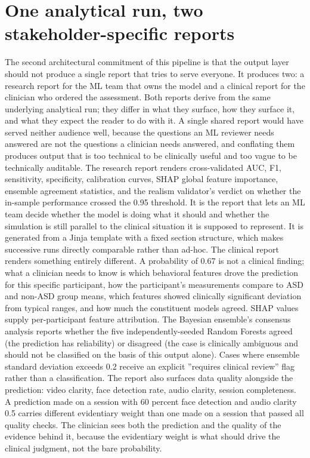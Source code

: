 \documentclass{obelus-preprint}
\begin{document}
\section{One analytical run, two stakeholder-specific reports}
The second architectural commitment of this pipeline is that the output layer should not produce a single report that tries to serve everyone. It produces two: a research report for the ML team that owns the model and a clinical report for the clinician who ordered the assessment. Both reports derive from the same underlying analytical run; they differ in what they surface, how they surface it, and what they expect the reader to do with it. A single shared report would have served neither audience well, because the questions an ML reviewer needs answered are not the questions a clinician needs answered, and conflating them produces output that is too technical to be clinically useful and too vague to be technically auditable.
The research report renders cross-validated AUC, F1, sensitivity, specificity, calibration curves, SHAP global feature importance, ensemble agreement statistics, and the realism validator's verdict on whether the in-sample performance crossed the 0.95 threshold. It is the report that lets an ML team decide whether the model is doing what it should and whether the simulation is still parallel to the clinical situation it is supposed to represent. It is generated from a Jinja template with a fixed section structure, which makes successive runs directly comparable rather than ad-hoc.
The clinical report renders something entirely different. A probability of 0.67 is not a clinical finding; what a clinician needs to know is which behavioral features drove the prediction for this specific participant, how the participant's measurements compare to ASD and non-ASD group means, which features showed clinically significant deviation from typical ranges, and how much the constituent models agreed. SHAP values supply per-participant feature attribution. The Bayesian ensemble's consensus analysis reports whether the five independently-seeded Random Forests agreed (the prediction has reliability) or disagreed (the case is clinically ambiguous and should not be classified on the basis of this output alone). Cases where ensemble standard deviation exceeds 0.2 receive an explicit ''requires clinical review'' flag rather than a classification.
The report also surfaces data quality alongside the prediction: video clarity, face detection rate, audio clarity, session completeness. A prediction made on a session with 60 percent face detection and audio clarity 0.5 carries different evidentiary weight than one made on a session that passed all quality checks. The clinician sees both the prediction and the quality of the evidence behind it, because the evidentiary weight is what should drive the clinical judgment, not the bare probability.
\end{document}
